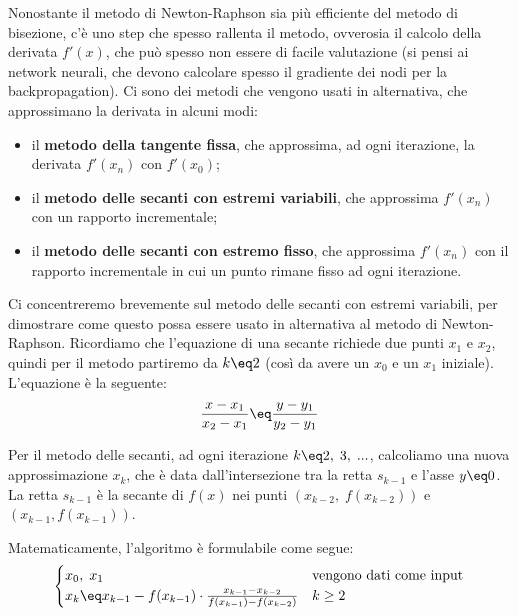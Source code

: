 Nonostante il metodo di Newton-Raphson sia più efficiente del metodo di bisezione, c'è uno step che spesso rallenta il metodo, ovverosia il calcolo della derivata $f'(x)$, che può spesso non essere di facile valutazione (si pensi ai network neurali, che devono calcolare spesso il gradiente dei nodi per la backpropagation). Ci sono dei metodi che vengono usati in alternativa, che approssimano la derivata in alcuni modi:
\begin{itemize}
    \item il \textbf{metodo della tangente fissa}, che approssima, ad ogni iterazione, la derivata $f'(x_n)$ con $f'(x_0)$;
    \item il \textbf{metodo delle secanti con estremi variabili}, che approssima $f'(x_n)$ con un rapporto incrementale;
    \item il \textbf{metodo delle secanti con estremo fisso}, che approssima $f'(x_n)$ con il rapporto incrementale in cui un punto rimane fisso ad ogni iterazione.
\end{itemize}

Ci concentreremo brevemente sul metodo delle secanti con estremi variabili, per dimostrare come questo possa essere usato in alternativa al metodo di Newton-Raphson. Ricordiamo che l'equazione di una secante richiede due punti $x_1$ e $x_2$, quindi per il metodo partiremo da $k \eq 2$ (così da avere un $x_0$ e un $x_1$ iniziale). L'equazione è la seguente:
\[ \frac{x - x_1}{x_2 - x_1} \eq \frac{y - y_1}{y_2 - y_1} \]

Per il metodo delle secanti, ad ogni iterazione $k \eq 2, \; 3, \; ...$, calcoliamo una nuova approssimazione $x_k$, che è data dall'intersezione tra la retta $s_{k - 1}$ e l'asse $y \eq 0$. La retta $s_{k - 1}$ è la secante di $f(x)$ nei punti $(x_{k - 2}, \; f(x_{k - 2}))$ e $(x_{k - 1}, f(x_{k - 1}))$.

Matematicamente, l'algoritmo è formulabile come segue:
\[ \begin{cases}
    x_0, \; x_1 & \text{vengono dati come input} \\
    x_k \eq x_{k - 1} - f(x_{k - 1}) \cdot \frac{x_{k - 1} - x_{k - 2}}{f(x_{k - 1}) - f(x_{k - 2})} & k \geq 2
\end{cases} \]

